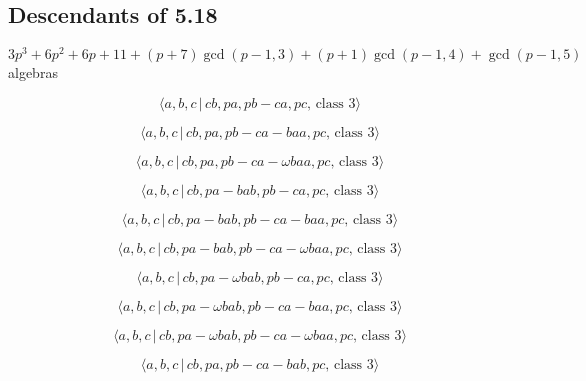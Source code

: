 \documentclass[10pt]{article}
\begin{document}
\subsection{Descendants of 5.18}

$3p^{3}+6p^{2}+6p+11+(p+7)\gcd (p-1,3)+(p+1)\gcd (p-1,4)+\gcd (p-1,5)$
algebras

\begin{equation}
\langle a,b,c\,|\,cb,pa,pb-ca,pc,\,\text{class }3\rangle  \tag{7.874}
\end{equation}

\begin{equation}
\langle a,b,c\,|\,cb,pa,pb-ca-baa,pc,\,\text{class }3\rangle  \tag{7.875}
\end{equation}

\begin{equation}
\langle a,b,c\,|\,cb,pa,pb-ca-\omega baa,pc,\,\text{class }3\rangle 
\tag{7.876}
\end{equation}

\begin{equation}
\langle a,b,c\,|\,cb,pa-bab,pb-ca,pc,\,\text{class }3\rangle  \tag{7.877}
\end{equation}

\begin{equation}
\langle a,b,c\,|\,cb,pa-bab,pb-ca-baa,pc,\,\text{class }3\rangle  \tag{7.878}
\end{equation}

\begin{equation}
\langle a,b,c\,|\,cb,pa-bab,pb-ca-\omega baa,pc,\,\text{class }3\rangle 
\tag{7.879}
\end{equation}

\begin{equation}
\langle a,b,c\,|\,cb,pa-\omega bab,pb-ca,pc,\,\text{class }3\rangle 
\tag{7.880}
\end{equation}

\begin{equation}
\langle a,b,c\,|\,cb,pa-\omega bab,pb-ca-baa,pc,\,\text{class }3\rangle 
\tag{7.881}
\end{equation}

\begin{equation}
\langle a,b,c\,|\,cb,pa-\omega bab,pb-ca-\omega baa,pc,\,\text{class }%
3\rangle  \tag{7.882}
\end{equation}

\begin{equation}
\langle a,b,c\,|\,cb,pa,pb-ca-bab,pc,\,\text{class }3\rangle  \tag{7.883}
\end{equation}
\end{document}
